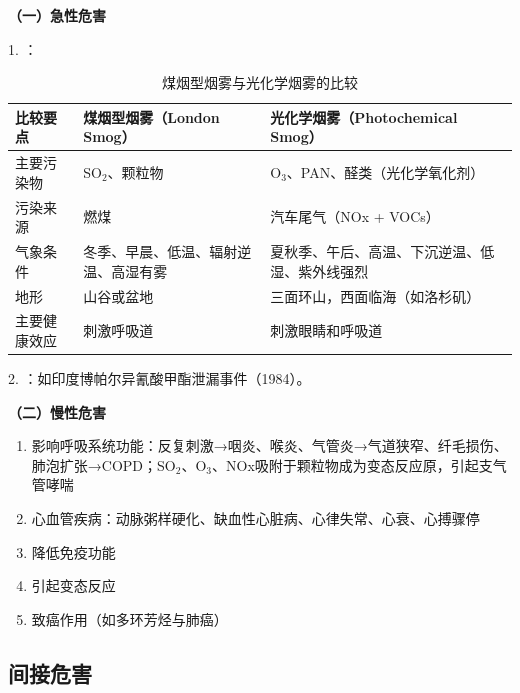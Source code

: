 \documentclass[10pt,a4paper,oneside]{ctexbook}
\begin{document}
\begin{keybox}
\textbf{（一）急性危害}

1. ：

\begin{table}[H]
\centering
\caption{煤烟型烟雾与光化学烟雾的比较}
\begin{tabularx}{\textwidth}{lXX}
\hline
\textbf{比较要点} & \textbf{煤烟型烟雾（London Smog）} & \textbf{光化学烟雾（Photochemical Smog）} \\
\hline
主要污染物 & SO$_2$、颗粒物 & O$_3$、PAN、醛类（光化学氧化剂） \\
污染来源 & 燃煤 & 汽车尾气（NOx + VOCs） \\
气象条件 & 冬季、早晨、低温、辐射逆温、高湿有雾 & 夏秋季、午后、高温、下沉逆温、低湿、紫外线强烈 \\
地形 & 山谷或盆地 & 三面环山，西面临海（如洛杉矶） \\
主要健康效应 & 刺激呼吸道 & 刺激眼睛和呼吸道 \\
\hline
\end{tabularx}
\end{table}

2. ：如印度博帕尔异氰酸甲酯泄漏事件（1984）。

\textbf{（二）慢性危害}
\begin{enumerate}[leftmargin=*]
    \item 影响呼吸系统功能：反复刺激→咽炎、喉炎、气管炎→气道狭窄、纤毛损伤、肺泡扩张→COPD；SO$_2$、O$_3$、NOx吸附于颗粒物成为变态反应原，引起支气管哮喘
    \item 心血管疾病：动脉粥样硬化、缺血性心脏病、心律失常、心衰、心搏骤停
    \item 降低免疫功能
    \item 引起变态反应
    \item 致癌作用（如多环芳烃与肺癌）
\end{enumerate}
\end{keybox}

\subsection{间接危害}
\end{document}
